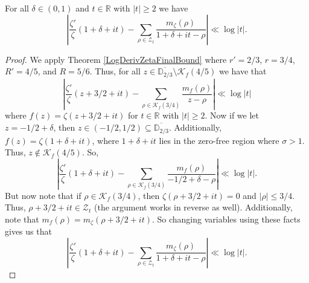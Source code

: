 \begin{theorem}[SumBoundI]
\label{SumBoundI}
\leanok
For all $\delta\in (0,1)$ and $t\in\mathbb{R}$ with $|t|\geq 2$ we have
    $$\left|\frac{\zeta'}{\zeta}(1+\delta+it)
      -\sum_{\rho\in\mathcal{Z}_t}\frac{m_\zeta(\rho)}{1+\delta+it-\rho}\right|\ll\log|t|.$$
\end{theorem}
\begin{proof}
\leanok
We apply Theorem \ref{LogDerivZetaFinalBound} where $r'=2/3$, $r=3/4$, $R'=4/5$, and
    $R=5/6$. Thus, for all $z\in\overline{\mathbb{D}_{2/3}}\setminus\mathcal{K}_f(4/5)$
    we have that
    $$\left|\frac{\zeta'}{\zeta}(z+3/2+it)
      -\sum_{\rho\in\mathcal{K}_f(3/4)}\frac{m_f(\rho)}{z-\rho}\right|\ll\log|t|$$
    where $f(z)=\zeta(z+3/2+it)$ for $t\in\mathbb{R}$ with $|t|\geq 2$. Now if we let
    $z=-1/2+\delta$, then $z\in(-1/2,1/2)\subseteq\overline{\mathbb{D}_{2/3}}$.
    Additionally, $f(z)=\zeta(1+\delta+it)$, where $1+\delta+it$ lies in the zero-free
    region where $\sigma>1$. Thus, $z\not\in\mathcal{K}_f(4/5)$. So,
    $$\left|\frac{\zeta'}{\zeta}(1+\delta+it)
      -\sum_{\rho\in\mathcal{K}_f(3/4)}\frac{m_f(\rho)}{-1/2+\delta-\rho}\right|
      \ll\log|t|.$$
    But now note that if $\rho\in\mathcal{K}_f(3/4)$, then $\zeta(\rho+3/2+it)=0$ and
    $|\rho|\leq 3/4$. Thus, $\rho+3/2+it\in\mathcal{Z}_t$ (the argument works in reverse as well).
    Additionally, note that $m_f(\rho)=m_\zeta(\rho+3/2+it)$. So changing variables using these
    facts gives us that
    $$\left|\frac{\zeta'}{\zeta}(1+\delta+it)
      -\sum_{\rho\in\mathcal{Z}_t}\frac{m_\zeta(\rho)}{1+\delta+it-\rho}\right|
      \ll\log|t|.$$
\end{proof}
